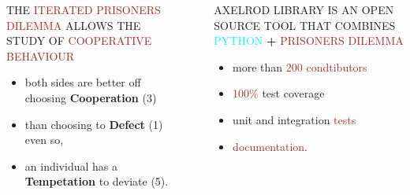 \documentclass[usenames,dvipsnames,t]{beamer}
\begin{document}
\begin{frame}[fragile]

\begin{columns}
  \begin{column}{.33\linewidth}

    \centering
    \Large{THE \textcolor{brown}{ITERATED PRISONERS DILEMMA}
    ALLOWS THE STUDY OF \textcolor{brown}{COOPERATIVE BEHAVIOUR}}
    \Large{
    \begin{itemize}
      \item both sides are better off choosing \textbf{Cooperation} (3)
      \item than choosing to \textbf{Defect} (1) even so,
      \item an individual has a \textbf{Tempetation} to deviate (5).
    \end{itemize}
    }
  \end{column}
  \begin{column}{.30\linewidth}

  \begin{center}
   
   \end{center}
  \end{column}
  \begin{column}{.30\linewidth}

    \begin{center}
    \large{
    AXELROD LIBRARY IS AN OPEN SOURCE TOOL THAT COMBINES
    \textcolor{cyan}{PYTHON} \textbf{+} \textcolor{brown}{PRISONERS DILEMMA}}

    \large{
    \begin{itemize}[leftmargin=1.7in]
    \item more than \textcolor{brown}{200 condtibutors}
    \item \textcolor{brown}{100\%} test coverage
    \item unit and integration \textcolor{brown}{tests}
    \item \textcolor{brown}{documentation}.
    \end{itemize}
    }
    \end{center}
  \end{column}

  \end{columns}
  \begin{columns}
    \begin{column}{.30\linewidth}
   \vspace{1cm}


\end{column}
\end{columns}
\end{frame}
\end{document}
